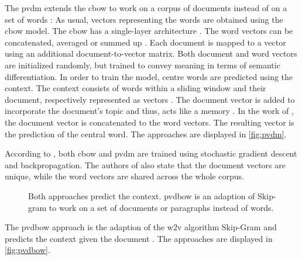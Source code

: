 The \ac{pvdm} extends the \ac{cbow} to work on a corpus of documents instead of on a set of words \cite{clusteringDocs2020}:
As usual, vectors representing the words are obtained using the \ac{cbow} model.
The \ac{cbow} has a single-layer architecture \cite{glove2014}. %
The word vectors can be concatenated, averaged or summed up \cite{SentRep2014}.
Each document is mapped to a vector using an additional document-to-vector matrix.
Both document and word vectors are initialized randomly, but trained to convey meaning in terms of semantic differentiation.
In order to train the model, centre words are predicted using the context.
The context consists of words within a sliding window and their document, respectively represented as vectors \cite{SentRep2014}.
The document vector is added to incorporate the document's topic and thus, acts like a memory \cite{SentRep2014, Top2Vec2020}.
In the work of \cite{SentRep2014}, the document vector is concatenated to the word vectors.
The resulting vector is the prediction of the central word.
The approaches are displayed in \autoref{fig:pvdm}.

According to \cite{SentRep2014}, both \ac{cbow} and \ac{pvdm} are trained using stochastic gradient descent and backpropagation.
The authors of \cite{SentRep2014} also state that the document vectors are unique, while the word vectors are shared across the whole corpus. 

\begin{figure}%
    \centering
    \qquad
    \caption{Both approaches predict the context.
    \ac{pvdbow} is an adaption of Skip-gram to work on a set of documents or paragraphs instead of words.
    }%
    \label{fig:pvdbow}%
\end{figure}
The \ac{pvdbow} approach is the adaption of the \ac{w2v} algorithm Skip-Gram and predicts the context 
given the document \cite{SentRep2014}.
The approaches are displayed in \autoref{fig:pvdbow}.


